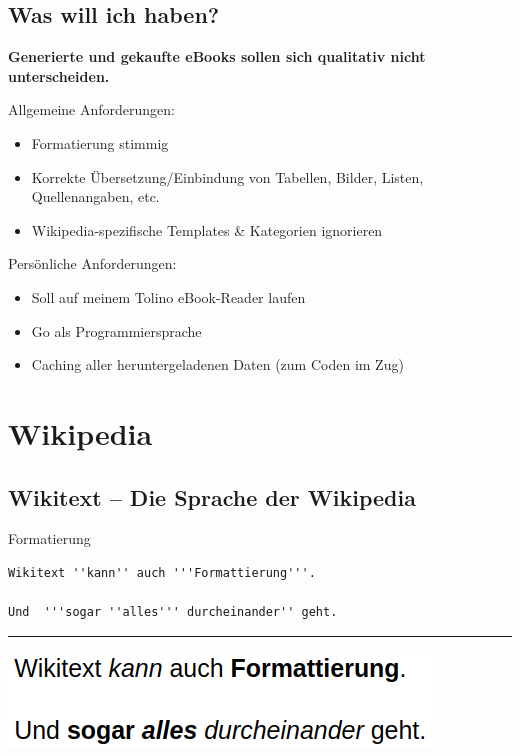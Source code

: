 \documentclass[9pt]{beamer}
\begin{document}
	\subsection{Was will ich haben?}
	\begin{frame}
		\begin{center}
			\textbf{Generierte und gekaufte eBooks sollen sich qualitativ nicht unterscheiden.}
		\end{center}\pause
		Allgemeine Anforderungen:
		\begin{itemize}
			\item Formatierung stimmig
			\item Korrekte Übersetzung/Einbindung von Tabellen, Bilder, Listen, Quellenangaben, etc.
			\item Wikipedia-spezifische Templates \& Kategorien ignorieren
		\end{itemize}\pause\n
		Persönliche Anforderungen:
		\begin{itemize}
			\item Soll auf meinem Tolino eBook-Reader laufen
			\item Go als Programmiersprache
			\item Caching aller heruntergeladenen Daten (zum Coden im Zug)
		\end{itemize}
	\end{frame}

	\section{Wikipedia}	
	
	\subsection{Wikitext -- Die Sprache der Wikipedia}
	
	\begin{frame}[fragile]{Formatierung}
		\begin{verbatim}
Wikitext ''kann'' auch '''Formattierung'''.

Und  '''sogar ''alles''' durcheinander'' geht.
		\end{verbatim}
		\hrule\n
		\includegraphics[scale=0.35]{images/wikitext-example-0-formatting.png}
	\end{frame}
	
\end{document}
